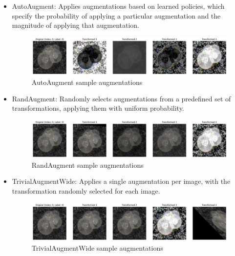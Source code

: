 \documentclass[letterpaper]{article}
\begin{document}
        \begin{itemize}
            \item AutoAugment: Applies augmentations based on learned policies, which specify the probability of applying a particular augmentation and the magnitude of applying that augmentation.
            
            \begin{figure}[H]
                \centering
                \includegraphics[width=1\linewidth]{Figure1-AutoAug.png}
                \caption{AutoAugment sample augmentations}
                \label{fig:autoaug}
            \end{figure}
            
            \item RandAugment: Randomly selects augmentations from a predefined set of transformations, applying them with uniform probability.

            \begin{figure}[H]
                \centering
                \includegraphics[width=1\linewidth]{Figure2-RandAug.png}
                \caption{RandAugment sample augmentations}
                \label{fig:randaug}
            \end{figure}
            
            \item TrivialAugmentWide: Applies a single augmentation per image, with the transformation randomly selected for each image.

            \begin{figure}[H]
                \centering
                \includegraphics[width=1\linewidth]{Figure3-TAW.png}
                \caption{TrivialAugmentWide sample augmentations}
                \label{fig:taw}
            \end{figure}
            

\end{itemize}
\end{document}
